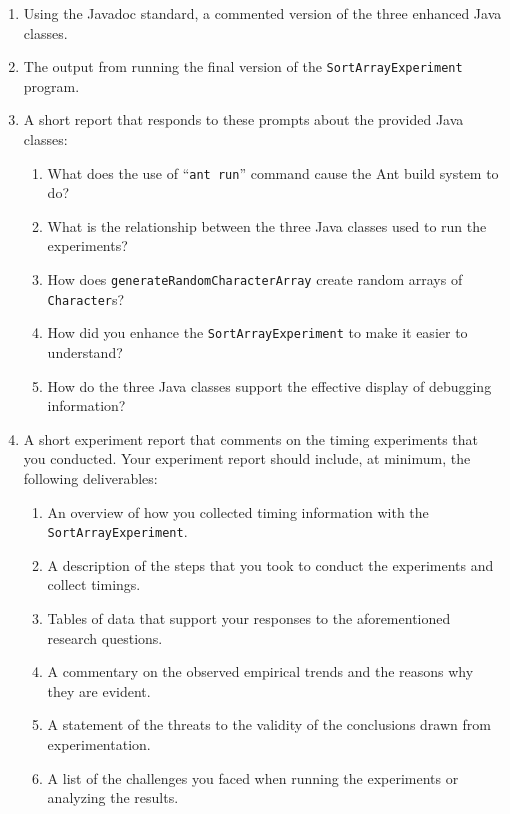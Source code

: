 \vspace*{-.05in}
\begin{enumerate}

  \itemsep 0em
  \item Using the Javadoc standard, a commented version of the three enhanced Java classes.

  \item The output from running the final version of the {\tt SortArrayExperiment} program.

  \item A short report that responds to these prompts about the provided Java classes:

    \vspace*{-.05in}
    \begin{enumerate}
      \itemsep 0em

      \item What does the use of ``{\tt ant run}'' command cause the Ant build system to do?

      \item What is the relationship between the three Java classes used to run the experiments?

      \item How does {\tt generateRandomCharacterArray} create random arrays of {\tt Character}s?

      \item How did you enhance the {\tt SortArrayExperiment} to make it easier to understand?

      \item How do the three Java classes support the effective display of debugging information?

    \end{enumerate}

  \item A short experiment report that comments on the timing experiments that you conducted. Your experiment report
    should include, at minimum, the following deliverables:

    \vspace*{-.05in}
    \begin{enumerate}
      \itemsep 0em
      \item An overview of how you collected timing information with the {\tt SortArrayExperiment}.
      \item A description of the steps that you took to conduct the experiments and collect timings.
      \item Tables of data that support your responses to the aforementioned research questions.
      \item A commentary on the observed empirical trends and the reasons why they are evident.
      \item A statement of the threats to the validity of the conclusions drawn from experimentation.
      \item A list of the challenges you faced when running the experiments or analyzing the results.
    \end{enumerate}


\end{enumerate}
